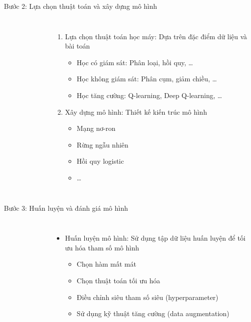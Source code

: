 \documentclass{beamer}
\begin{document}
\begin{frame}{Bước 2: Lựa chọn thuật toán và xây dựng mô hình}
    \begin{columns}
        \begin{figure}
            \centering
        \end{figure}
        \begin{enumerate}
            \item Lựa chọn thuật toán học máy: Dựa trên đặc điểm dữ liệu và bài toán
            \begin{itemize}
                \item Học có giám sát: Phân loại, hồi quy, \dots
                \item Học không giám sát: Phân cụm, giảm chiều, \dots
                \item Học tăng cường: Q-learning, Deep Q-learning, \dots
            \end{itemize}
            \item Xây dựng mô hình: Thiết kế kiến trúc mô hình
            \begin{itemize}
                \item Mạng nơ-ron
                \item Rừng ngẫu nhiên
                \item Hồi quy logistic
                \item \dots
            \end{itemize}
        \end{enumerate}
    \end{columns}
\end{frame}

\begin{frame}{Bước 3: Huấn luyện và đánh giá mô hình}
    \begin{columns}
        \begin{figure}
            \centering
        \end{figure}
        \begin{itemize}
            \item Huấn luyện mô hình: Sử dụng tập dữ liệu huấn luyện để tối ưu hóa tham số mô hình
            \begin{itemize}
                \item Chọn hàm mất mát
                \item Chọn thuật toán tối ưu hóa
                \item Điều chỉnh siêu tham số siêu (hyperparameter)
                \item Sử dụng kỹ thuật tăng cường (data augmentation)
            \end{itemize}
        \end{itemize}
    \end{columns}
\end{frame}
\end{document}
